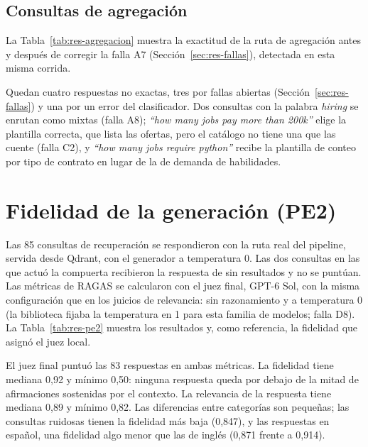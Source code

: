 \subsection{Consultas de agregación}
\label{sec:res-agregacion}

La Tabla~\ref{tab:res-agregacion} muestra la exactitud de la ruta de agregación antes y después de corregir la falla A7 (Sección~\ref{sec:res-fallas}), detectada en esta misma corrida.



Quedan cuatro respuestas no exactas, tres por fallas abiertas (Sección~\ref{sec:res-fallas}) y una por un error del clasificador. Dos consultas con la palabra \textit{hiring} se enrutan como mixtas (falla A8); \textit{\enquote{how many jobs pay more than 200k}} elige la plantilla correcta, que lista las ofertas, pero el catálogo no tiene una que las cuente (falla C2), y \textit{\enquote{how many jobs require python}} recibe la plantilla de conteo por tipo de contrato en lugar de la de demanda de habilidades.

\section{Fidelidad de la generación (PE2)}
\label{sec:res-pe2}

Las 85 consultas de recuperación se respondieron con la ruta real del pipeline, servida desde Qdrant, con el generador a temperatura 0. Las dos consultas en las que actuó la compuerta recibieron la respuesta de sin resultados y no se puntúan. Las métricas de RAGAS se calcularon con el juez final, GPT-6 Sol, con la misma configuración que en los juicios de relevancia: sin razonamiento y a temperatura 0 (la biblioteca fijaba la temperatura en 1 para esta familia de modelos; falla D8). La Tabla~\ref{tab:res-pe2} muestra los resultados y, como referencia, la fidelidad que asignó el juez local.



El juez final puntuó las 83 respuestas en ambas métricas. La fidelidad tiene mediana 0,92 y mínimo 0,50: ninguna respuesta queda por debajo de la mitad de afirmaciones sostenidas por el contexto. La relevancia de la respuesta tiene mediana 0,89 y mínimo 0,82. Las diferencias entre categorías son pequeñas; las consultas ruidosas tienen la fidelidad más baja (0,847), y las respuestas en español, una fidelidad algo menor que las de inglés (0,871 frente a 0,914).

